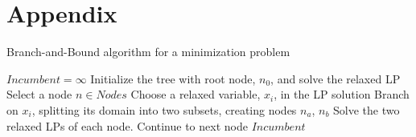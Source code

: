 \chapter{Appendix}

\begin{algorithm}[H]
	\caption{Branch-and-Bound algorithm for a minimization problem}
	\label{alg:lit:bab}
	\begin{algorithmic}[1]
		\Statex
		\State $Incumbent=\infty$
		\State Initialize the tree with root node, $n_0$, and solve the relaxed LP
		 
		\Statex
			\State Select a node $n\in Nodes$
			\State Choose a relaxed variable, $x_i$, in the LP solution
			\State Branch on $x_i$, splitting its domain into two subsets, creating nodes $n_a$, $n_b$
			\State Solve the two relaxed LPs of each node.
						 
					\EndIf
						 
						\State Continue to next node
					\EndIf
				\EndIf
				\EndIf
			\EndFor
		\EndWhile
		\Statex
		\State \Return $Incumbent$
	\end{algorithmic}
\end{algorithm}

